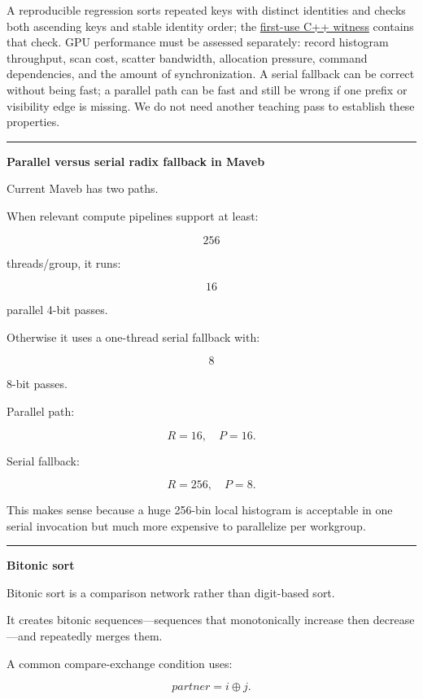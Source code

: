 A reproducible regression sorts repeated keys with distinct identities and checks both ascending keys and stable identity order; the \hyperref[source-file-a41016f2e326b40cdff18ff4]{first-use C++ witness} contains that check. GPU performance must be assessed separately: record histogram throughput, scan cost, scatter bandwidth, allocation pressure, command dependencies, and the amount of synchronization. A serial fallback can be correct without being fast; a parallel path can be fast and still be wrong if one prefix or visibility edge is missing. We do not need another teaching pass to establish these properties.

\begin{center}\rule{0.5\linewidth}{0.5pt}\end{center}

\textbf{Parallel versus serial radix fallback in Maveb}

Current Maveb has two paths.

When relevant compute pipelines support at least:

\[
256
\]

threads/group, it runs:

\[
16
\]

parallel 4-bit passes.

Otherwise it uses a one-thread serial fallback with:

\[
8
\]

8-bit passes.

Parallel path:

\[
R=16,
\quad
P=16.
\]

Serial fallback:

\[
R=256,
\quad
P=8.
\]

This makes sense because a huge 256-bin local histogram is acceptable in one serial invocation but much more expensive to parallelize per workgroup.

\begin{center}\rule{0.5\linewidth}{0.5pt}\end{center}

\textbf{Bitonic sort}

Bitonic sort is a comparison network rather than digit-based sort.

It creates bitonic sequences---sequences that monotonically increase then decrease---and repeatedly merges them.

A common compare-exchange condition uses:

\[
partner=i\oplus j.
\]

